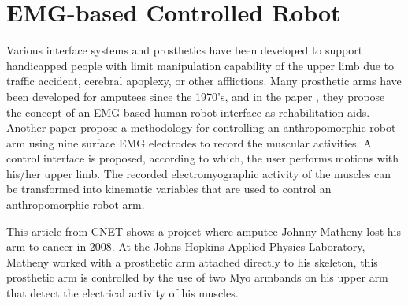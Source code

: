 \section{EMG-based Controlled Robot}
Various interface systems and prosthetics have been developed to support handicapped people with limit manipulation capability of the upper limb due to traffic accident, cerebral apoplexy, or other afflictions. Many prosthetic arms have been developed for amputees since the 1970’s, and in the paper \cite{fukuda1998emg}, they propose the concept of an EMG-based human-robot interface as rehabilitation aids. Another paper \cite{artemiadis2010emg} propose a methodology for controlling an anthropomorphic robot arm using nine surface EMG electrodes to record the muscular activities. A control interface is proposed, according to which, the user performs motions with his/her upper limb. The recorded electromyographic activity of the muscles can be transformed into kinematic variables that are used to control an anthropomorphic robot arm.

This article from CNET \cite{cnet:myoarm} shows a project where amputee Johnny Matheny lost his arm to cancer in 2008. At the Johns Hopkins Applied Physics Laboratory, Matheny worked with a prosthetic arm attached directly to his skeleton, this prosthetic arm is controlled by the use of two Myo armbands on his upper arm that detect the electrical activity of his muscles.